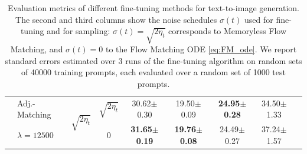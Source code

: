 \documentclass[]{fairmeta}
\begin{document}
\begin{table}[t]
\begin{tabular}{llccccccc}
    \\
    \addlinespace
    & Adj.-Matching  & \multirow{2}{*}{$\sqrt{2 \eta_t}$} & $\sqrt{2 \eta_t}$ & 30.62{\tiny$\pm$0.30} & 19.50{\tiny$\pm$0.09} & \textbf{24.95{\tiny$\pm$0.28}} & 34.50{\tiny$\pm$1.33}
    \\
    & $\lambda = 12500$                    &                                    & 0                 & \textbf{31.65{\tiny$\pm$0.19}} & \textbf{19.76{\tiny$\pm$0.08}} & 24.49{\tiny$\pm$0.27} & 37.24{\tiny$\pm$1.57} 
    \\
    \bottomrule
\end{tabular}
\caption{Evaluation metrics of different fine-tuning methods for text-to-image generation. 
The second and third columns show the noise schedules $\sigma(t)$ used for fine-tuning and for sampling: $\sigma(t) = \sqrt{2\eta_t}$ corresponds to Memoryless Flow Matching, and $\sigma(t) = 0$ to the Flow Matching ODE \eqref{eq:FM_ode}. 
We report standard errors estimated over 3 runs of the fine-tuning algorithm on random sets of 40000 training prompts, each evaluated over a random set of 1000 test prompts. 
}
\label{tab:evaluation_metrics}
\end{table}
\end{document}
